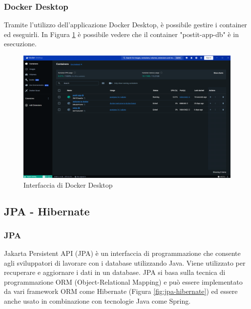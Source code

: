 \subsubsection{Docker Desktop}
Tramite l'utilizzo dell'applicazione Docker Desktop, è possibile gestire i container ed eseguirli.
In Figura \ref{fig:docker-desktop} è possibile vedere che il container "postit-app-db" è in esecuzione.
\begin{figure}[h]
    \centering
    \includegraphics[width=1.0\textwidth]{images/interfaccia docker desktop.png}
    \caption{Interfaccia di Docker Desktop}
    \label{fig:docker-desktop}
\end{figure}
\newpage
\subsection{JPA - Hibernate}

\subsubsection{JPA}
Jakarta Persistent API (JPA) è un interfaccia di programmazione che consente agli sviluppatori di lavorare con i database utilizzando Java.
Viene utilizzato per recuperare e aggiornare i dati in un database.
JPA si basa sulla tecnica di programmazione ORM (Object-Relational Mapping) e può essere implementato da vari framework ORM come Hibernate (Figura \ref{fig:jpa-hibernate}) ed essere anche usato in combinazione con tecnologie Java come Spring.\cite{jpa}

